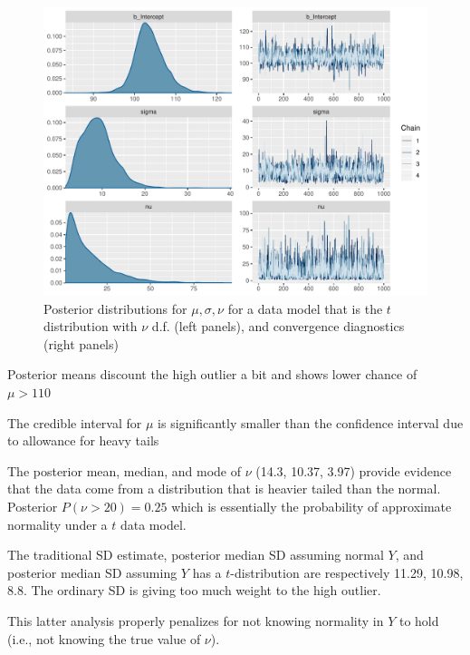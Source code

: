 \begin{Schunk}
\begin{figure}[htbp]
\centerline{\includegraphics[width=\maxwidth]{htest-bayesext2-1} }

\caption[Posterior distributions for $\mu, \sigma, \nu$ for a $t_{\nu}$ data model]{Posterior distributions for $\mu, \sigma, \nu$ for a data model that is the $t$ distribution with $\nu$ d.f. (left panels), and convergence diagnostics (right panels)}\label{fig:htest-bayesext2}
\end{figure}
\end{Schunk}

\bi
\item Posterior means discount the high outlier a bit and shows lower
  chance of $\mu > 110$
\item The credible interval for $\mu$ is significantly smaller than
  the confidence interval due to allowance for heavy tails
\item The posterior mean, median, and mode of $\nu$
  (14.3, 10.37, 3.97) provide evidence that the 
  data come from a distribution that is heavier tailed than the
  normal.  Posterior $P(\nu > 20) = 0.25$
  which is essentially the probability of approximate normality under a $t$ data model.
\item The traditional SD estimate, posterior median SD assuming normal
  $Y$, and posterior median SD assuming $Y$ has a $t$-distribution are
  respectively 11.29, 10.98, 8.8.  The ordinary SD is giving too much
  weight to the high outlier.
\ei

This latter analysis properly penalizes for not knowing normality in
$Y$ to hold (i.e., not knowing the true value of $\nu$).


